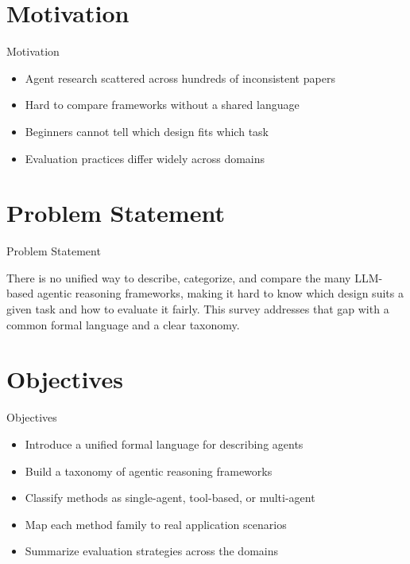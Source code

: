 \documentclass[10pt]{beamer}
\begin{document}
\section{Motivation}
\begin{frame}{Motivation}
\begin{itemize}
  \item Agent research scattered across hundreds of inconsistent papers
  \item Hard to compare frameworks without a shared language
  \item Beginners cannot tell which design fits which task
  \item Evaluation practices differ widely across domains
\end{itemize}
\end{frame}

\section{Problem Statement}
\begin{frame}{Problem Statement}
  \begin{block}{}
  There is no unified way to describe, categorize, and compare the many LLM-based agentic reasoning frameworks, making it hard to know which design suits a given task and how to evaluate it fairly. This survey addresses that gap with a common formal language and a clear taxonomy.
  \end{block}
\end{frame}

\section{Objectives}
\begin{frame}{Objectives}
\begin{itemize}
  \item Introduce a unified formal language for describing agents
  \item Build a taxonomy of agentic reasoning frameworks
  \item Classify methods as single-agent, tool-based, or multi-agent
  \item Map each method family to real application scenarios
  \item Summarize evaluation strategies across the domains
\end{itemize}
\end{frame}
\end{document}
